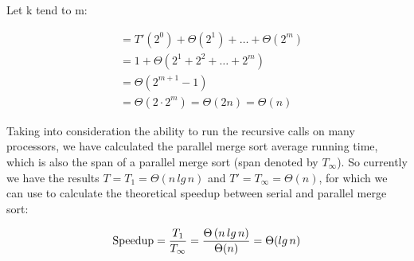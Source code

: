 \documentclass[12pt,twoside,notitlepage]{report}
\begin{document}
Let k tend to m:

\begin{align*}
&= T'\left(2^{0}\right) + \Theta\left(2^{1}\right) + \ldots + \Theta\left(2^{m}\right) \\
&= 1 + \Theta\left(2^{1} + 2^{2} + \ldots + 2^{m}\right) \\
&= \Theta\left(2^{m+1} - 1\right) \\
&= \Theta\left(2\cdot2^{m}\right)
= \Theta\left(2n\right)
= \Theta\left(n\right)
\end{align*}

Taking into consideration the ability to run the recursive calls on many processors, we have calculated the parallel merge sort average running time, which is also the span of a parallel merge sort (span denoted by $T_\infty$). So
currently we have the results $T = T_{1} = \Theta(n\,lg\,n)$ and $T' = T_{\infty} = \Theta(n)$, for which we can use to calculate the theoretical speedup between serial and parallel merge sort:

\begin{align*}
\text{Speedup} = {T_{1} \over T_{\infty}} = {\Theta\left(n\,lg\,n\right) \over \Theta(n)} = \Theta(lg\,n)
\end{align*}
\end{document}
